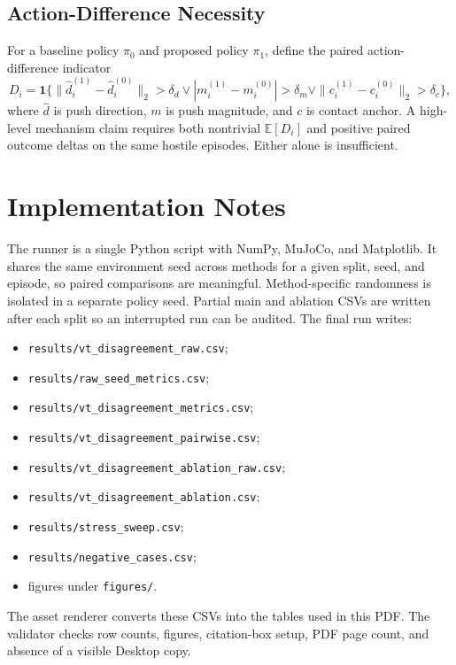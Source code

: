 \documentclass{article}
\begin{document}
\subsection{Action-Difference Necessity}

For a baseline policy $\pi_0$ and proposed policy $\pi_1$, define the paired action-difference indicator
\begin{equation}
  D_i=\mathbf{1}\{\|\hat d_i^{(1)}-\hat d_i^{(0)}\|_2>\delta_d
  \lor |m_i^{(1)}-m_i^{(0)}|>\delta_m
  \lor \|c_i^{(1)}-c_i^{(0)}\|_2>\delta_c\},
\end{equation}
where $\hat d$ is push direction, $m$ is push magnitude, and $c$ is contact anchor. A high-level mechanism claim requires both nontrivial $\mathbb{E}[D_i]$ and positive paired outcome deltas on the same hostile episodes. Either alone is insufficient.

\section{Implementation Notes}

The runner is a single Python script with NumPy, MuJoCo, and Matplotlib. It shares the same environment seed across methods for a given split, seed, and episode, so paired comparisons are meaningful. Method-specific randomness is isolated in a separate policy seed. Partial main and ablation CSVs are written after each split so an interrupted run can be audited. The final run writes:
\begin{itemize}
  \item \texttt{results/vt\_disagreement\_raw.csv};
  \item \texttt{results/raw\_seed\_metrics.csv};
  \item \texttt{results/vt\_disagreement\_metrics.csv};
  \item \texttt{results/vt\_disagreement\_pairwise.csv};
  \item \texttt{results/vt\_disagreement\_ablation\_raw.csv};
  \item \texttt{results/vt\_disagreement\_ablation.csv};
  \item \texttt{results/stress\_sweep.csv};
  \item \texttt{results/negative\_cases.csv};
  \item figures under \texttt{figures/}.
\end{itemize}

The asset renderer converts these CSVs into the tables used in this PDF. The validator checks row counts, figures, citation-box setup, PDF page count, and absence of a visible Desktop copy.
\end{document}
